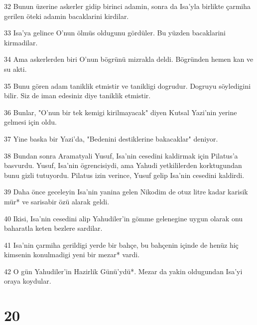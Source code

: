 \par 32 Bunun üzerine askerler gidip birinci adamin, sonra da Isa'yla birlikte çarmiha gerilen öteki adamin bacaklarini kirdilar.
\par 33 Isa'ya gelince O'nun ölmüs oldugunu gördüler. Bu yüzden bacaklarini kirmadilar.
\par 34 Ama askerlerden biri O'nun bögrünü mizrakla deldi. Bögründen hemen kan ve su akti.
\par 35 Bunu gören adam taniklik etmistir ve tanikligi dogrudur. Dogruyu söyledigini bilir. Siz de iman edesiniz diye taniklik etmistir.
\par 36 Bunlar, "O'nun bir tek kemigi kirilmayacak" diyen Kutsal Yazi'nin yerine gelmesi için oldu.
\par 37 Yine baska bir Yazi'da, "Bedenini destiklerine bakacaklar" deniyor.
\par 38 Bundan sonra Aramatyali Yusuf, Isa'nin cesedini kaldirmak için Pilatus'a basvurdu. Yusuf, Isa'nin ögrencisiydi, ama Yahudi yetkililerden korktugundan bunu gizli tutuyordu. Pilatus izin verince, Yusuf gelip Isa'nin cesedini kaldirdi.
\par 39 Daha önce geceleyin Isa'nin yanina gelen Nikodim de otuz litre kadar karisik mür* ve sarisabir özü alarak geldi.
\par 40 Ikisi, Isa'nin cesedini alip Yahudiler'in gömme gelenegine uygun olarak onu baharatla keten bezlere sardilar.
\par 41 Isa'nin çarmiha gerildigi yerde bir bahçe, bu bahçenin içinde de henüz hiç kimsenin konulmadigi yeni bir mezar* vardi.
\par 42 O gün Yahudiler'in Hazirlik Günü'ydü*. Mezar da yakin oldugundan Isa'yi oraya koydular.

\chapter{20}

